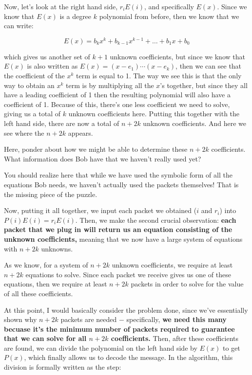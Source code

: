 \documentclass[10pt]{article}
\begin{document}
    Now, let's look at the right hand side, $r_iE(i)$, and specifically $E(x)$. Since we know that $E(x)$ is a degree $k$ polynomial from before, then we know that we can write: 

    \[ E(x) = b_kx^k + b_{k-1}x^{k-1} + \dots + b_1x + b_0\] 

    which gives us another set of $k+1$ unknown coefficients, but since we know that $E(x)$ is also written as $E(x) = (x-e_1)\cdots (x-e_k)$, then we can see that the coefficient of the $x^k$ term is equal to 1. The way we see this is that the only way to obtain an $x^k$ term is by multiplying all the $x$'s together, but since they all have a leading coefficient of 1 then the resulting polynomial will also have a coefficient of 1. Because of this, there's one less coefficient we need to solve, giving us a total of $k$ unknown coefficients here. Putting this together with the left hand side, there are now a total of $n+2k$ unknown coefficients. And here we see where the $n+2k$ appears.

    \begin{guidance*}{}{}
        Here, ponder about how we might be able to determine these $n+2k$ coefficients. What information does Bob have that we haven't really used yet? 

        You should realize here that while we have used the symbolic form of all the equations Bob needs, we haven't actually used the packets themselves! That is the missing piece of the puzzle. 
    \end{guidance*}

    Now, putting it all together, we input each packet we obtained ($i$ and $r_i$) into $P(i)E(i) = r_iE(i)$. Then, we make the second crucial observation: \textbf{each packet that we plug in will return us an equation consisting of the unknown coefficients,} meaning that we now have a large system of equations with $n+2k$ unknowns. 

    As we know, for a system of $n+2k$ unknown coefficients, we require at least $n+2k$ equations to solve. Since each packet we receive gives us one of these equations, then we require at least $n+2k$ packets in order to solve for the value of all these coefficients.

    At this point, I would basically consider the problem done, since we've essentially shown why $n+2k$ packets are needed $-$ specifically, \textbf{we need this many becuase it's the minimum number of packets required to guarantee that we can solve for all $n+2k$ coefficients.} Then, after these coefficients are found, we can divide the polynomial on the left hand side by $E(x)$ to get $P(x)$, which finally allows us to decode the message. In the algorithm, this division is formally written as the step: 
\end{document}
